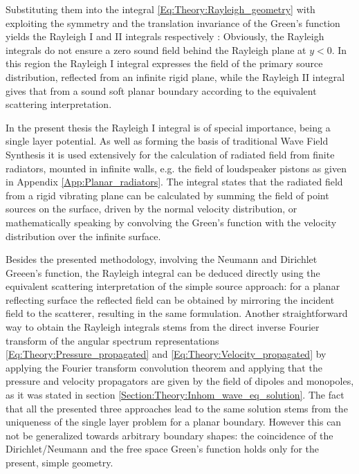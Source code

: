 Substituting them into the integral \eqref{Eq:Theory:Rayleigh_geometry} with exploiting the symmetry and the translation invariance of the Green's function yields the Rayleigh I and II integrals respectively \cite{Berkhout1984}:
Obviously, the Rayleigh integrals do not ensure a zero sound field behind the Rayleigh plane at $y<0$.
In this region the Rayleigh I integral expresses the field of the primary source distribution, reflected from an infinite rigid plane, while the Rayleigh II integral gives that from a sound soft planar boundary according to the equivalent scattering interpretation.

In the present thesis the Rayleigh I integral is of special importance, being a single layer potential.
As well as forming the basis of traditional Wave Field Synthesis it is used extensively for the calculation of radiated field from finite radiators, mounted in infinite walls, e.g. the field of loudspeaker pistons as given in Appendix \ref{App:Planar_radiators}.
The integral states that the radiated field from a rigid vibrating plane can be calculated by summing the field of point sources on the surface, driven by the normal velocity distribution, or mathematically speaking by convolving the Green's function with the velocity distribution over the infinite surface.

\vspace{3mm}
Besides the presented methodology, involving the Neumann and Dirichlet Greeen's function, the Rayleigh integral can be deduced directly using the equivalent scattering interpretation of the simple source approach: for a planar reflecting surface the reflected field can be obtained by mirroring the incident field to the scatterer, resulting in the same formulation.
Another straightforward way to obtain the Rayleigh integrals stems from the direct inverse Fourier transform of the angular spectrum representations \eqref{Eq:Theory:Pressure_propagated} and \eqref{Eq:Theory:Velocity_propagated} by applying the Fourier transform convolution theorem and applying that the pressure and velocity propagators are given by the field of dipoles and monopoles, as it was stated in section \ref{Section:Theory:Inhom_wave_eq_solution}.
The fact that all the presented three approaches lead to the same solution stems from the uniqueness of the single layer problem for a planar boundary.
However this can not be generalized towards arbitrary boundary shapes: the coincidence of the Dirichlet/Neumann and the free space Green's function holds only for the present, simple geometry. 